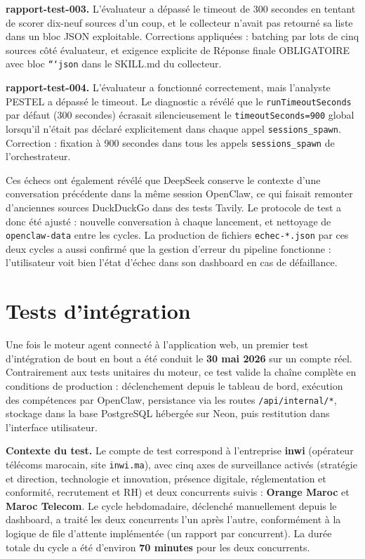 \documentclass[12pt,a4paper,openany]{report}
\begin{document}
\textbf{rapport-test-003.} L'évaluateur a dépassé le timeout de 300 secondes en tentant de scorer dix-neuf sources d'un coup, et le collecteur n'avait pas retourné sa liste dans un bloc JSON exploitable. Corrections appliquées : batching par lots de cinq sources côté évaluateur, et exigence explicite de \og Réponse finale OBLIGATOIRE avec bloc \texttt{```json}\fg{} dans le SKILL.md du collecteur.

\textbf{rapport-test-004.} L'évaluateur a fonctionné correctement, mais l'analyste PESTEL a dépassé le timeout. Le diagnostic a révélé que le \texttt{runTimeoutSeconds} par défaut (300 secondes) écrasait silencieusement le \texttt{timeoutSeconds=900} global lorsqu'il n'était pas déclaré explicitement dans chaque appel \texttt{sessions\_spawn}. Correction : fixation à 900 secondes dans tous les appels \texttt{sessions\_spawn} de l'orchestrateur.

Ces échecs ont également révélé que DeepSeek conserve le contexte d'une conversation précédente dans la même session OpenClaw, ce qui faisait remonter d'anciennes sources DuckDuckGo dans des tests Tavily. Le protocole de test a donc été ajusté : nouvelle conversation à chaque lancement, et nettoyage de \texttt{openclaw-data} entre les cycles. La production de fichiers \texttt{echec-*.json} par ces deux cycles a aussi confirmé que la gestion d'erreur du pipeline fonctionne : l'utilisateur voit bien l'état d'échec dans son dashboard en cas de défaillance.

\section{Tests d'intégration}
\label{sec:tests-integration}

Une fois le moteur agent connecté à l'application web, un premier test d'intégration de bout en bout a été conduit le \textbf{30 mai 2026} sur un compte réel. Contrairement aux tests unitaires du moteur, ce test valide la chaîne complète en conditions de production : déclenchement depuis le tableau de bord, exécution des compétences par OpenClaw, persistance via les routes \texttt{/api/internal/*}, stockage dans la base PostgreSQL hébergée sur Neon, puis restitution dans l'interface utilisateur.

\textbf{Contexte du test.} Le compte de test correspond à l'entreprise \textbf{inwi} (opérateur télécoms marocain, site \texttt{inwi.ma}), avec cinq axes de surveillance activés (stratégie et direction, technologie et innovation, présence digitale, réglementation et conformité, recrutement et RH) et deux concurrents suivis : \textbf{Orange Maroc} et \textbf{Maroc Telecom}. Le cycle hebdomadaire, déclenché manuellement depuis le dashboard, a traité les deux concurrents l'un après l'autre, conformément à la logique de file d'attente implémentée (un rapport par concurrent). La durée totale du cycle a été d'environ \textbf{70 minutes} pour les deux concurrents.
\end{document}

